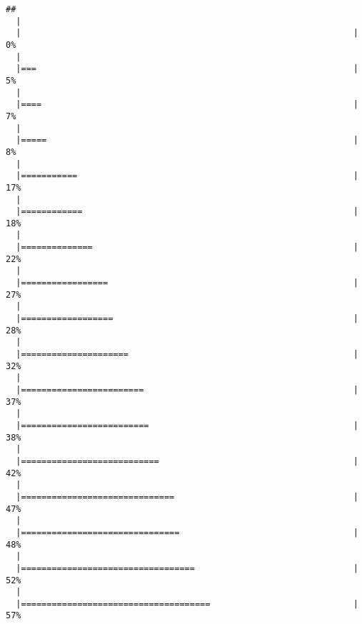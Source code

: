 \documentclass[]{article}
\begin{document}
\begin{verbatim}
## 
  |                                                                       
  |                                                                 |   0%
  |                                                                       
  |===                                                              |   5%
  |                                                                       
  |====                                                             |   7%
  |                                                                       
  |=====                                                            |   8%
  |                                                                       
  |===========                                                      |  17%
  |                                                                       
  |============                                                     |  18%
  |                                                                       
  |==============                                                   |  22%
  |                                                                       
  |=================                                                |  27%
  |                                                                       
  |==================                                               |  28%
  |                                                                       
  |=====================                                            |  32%
  |                                                                       
  |========================                                         |  37%
  |                                                                       
  |=========================                                        |  38%
  |                                                                       
  |===========================                                      |  42%
  |                                                                       
  |==============================                                   |  47%
  |                                                                       
  |===============================                                  |  48%
  |                                                                       
  |==================================                               |  52%
  |                                                                       
  |=====================================                            |  57%

\end{verbatim}
\end{document}
